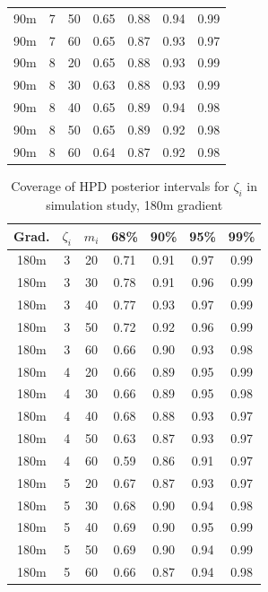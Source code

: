 \begin{table}
\begin{center}
\begin{tabular}{ccc|cccc}
  90m &   7 &  50 & 0.65 & 0.88 & 0.94 & 0.99 \\ 
  90m &   7 &  60 & 0.65 & 0.87 & 0.93 & 0.97 \\ 
   \hline
90m &   8 &  20 & 0.65 & 0.88 & 0.93 & 0.99 \\ 
  90m &   8 &  30 & 0.63 & 0.88 & 0.93 & 0.99 \\ 
  90m &   8 &  40 & 0.65 & 0.89 & 0.94 & 0.98 \\ 
  90m &   8 &  50 & 0.65 & 0.89 & 0.92 & 0.98 \\ 
  90m &   8 &  60 & 0.64 & 0.87 & 0.92 & 0.98 \\ 
   \hline
\end{tabular}
\end{center}
\end{table}

\begin{table}
\begin{center}
\caption{Coverage of HPD posterior intervals for $\zeta_i$ in simulation study, 180m gradient
\label{tab:sim_coverage_180m}}
\begin{tabular}{ccc|cccc}
 Grad. & $\zeta_i$ & $m_i$ & 68\% & 90\% & 95\% & 99\% \\ 
  \hline
180m &   3 &  20 & 0.71 & 0.91 & 0.97 & 0.99 \\ 
  180m &   3 &  30 & 0.78 & 0.91 & 0.96 & 0.99 \\ 
  180m &   3 &  40 & 0.77 & 0.93 & 0.97 & 0.99 \\ 
  180m &   3 &  50 & 0.72 & 0.92 & 0.96 & 0.99 \\ 
  180m &   3 &  60 & 0.66 & 0.90 & 0.93 & 0.98 \\ 
   \hline
180m &   4 &  20 & 0.66 & 0.89 & 0.95 & 0.99 \\ 
  180m &   4 &  30 & 0.66 & 0.89 & 0.95 & 0.98 \\ 
  180m &   4 &  40 & 0.68 & 0.88 & 0.93 & 0.97 \\ 
  180m &   4 &  50 & 0.63 & 0.87 & 0.93 & 0.97 \\ 
  180m &   4 &  60 & 0.59 & 0.86 & 0.91 & 0.97 \\ 
   \hline
180m &   5 &  20 & 0.67 & 0.87 & 0.93 & 0.97 \\ 
  180m &   5 &  30 & 0.68 & 0.90 & 0.94 & 0.98 \\ 
  180m &   5 &  40 & 0.69 & 0.90 & 0.95 & 0.99 \\ 
  180m &   5 &  50 & 0.69 & 0.90 & 0.94 & 0.99 \\ 
  180m &   5 &  60 & 0.66 & 0.87 & 0.94 & 0.98 \\ 

\end{tabular}
\end{center}
\end{table}
